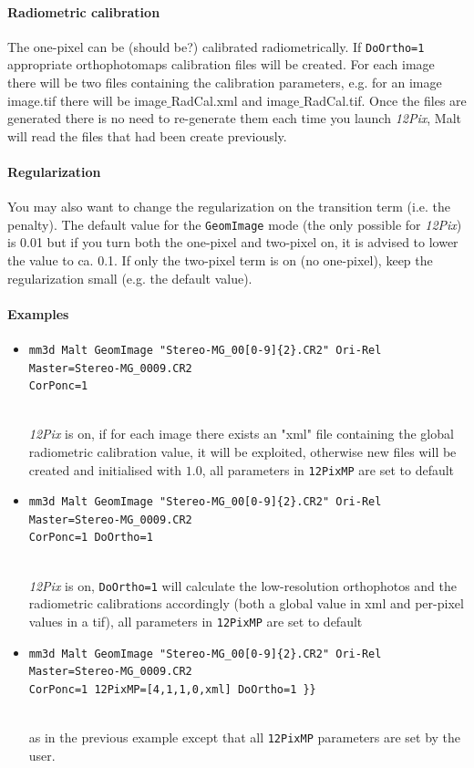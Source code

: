 \paragraph*{Radiometric calibration}
The one-pixel can be (should be?) calibrated radiometrically. If  {\tt{DoOrtho=1}} appropriate orthophotomaps calibration files will be created. For each image there will be two files containing the calibration parameters, e.g. for an image image.tif there will be  image$\_$RadCal.xml  and  image$\_$RadCal.tif. Once the files are generated there is no need to re-generate them each time you launch  \textit{12Pix}, Malt will read the files that had been create previously.\\
%
\paragraph*{Regularization}
You may also want to change the regularization on the transition term (i.e. the penalty). The default value for the {\tt GeomImage} mode (the only possible for \textit{12Pix}) is 0.01 but if you turn both the one-pixel and two-pixel on, it is advised to lower the value to ca. 0.1. If only the two-pixel term is on (no one-pixel), keep the regularization small (e.g. the default value).

\paragraph*{Examples}
%
\begin{itemize}
\item 
\begin{verbatim}  
mm3d Malt GeomImage "Stereo-MG_00[0-9]{2}.CR2" Ori-Rel Master=Stereo-MG_0009.CR2 
CorPonc=1 
\end{verbatim}\\
\textit{12Pix} is on, if for each image there exists an "xml" file containing the global radiometric calibration value, it will be exploited, otherwise new files will be created and initialised with $1.0$, all parameters in {\tt 12PixMP} are set to default
\\
\item 
\begin{verbatim}   
mm3d Malt GeomImage "Stereo-MG_00[0-9]{2}.CR2" Ori-Rel Master=Stereo-MG_0009.CR2 
CorPonc=1 DoOrtho=1 
\end{verbatim}\\
\textit{12Pix} is on, {\tt DoOrtho=1} will calculate the low-resolution orthophotos and the radiometric calibrations accordingly (both a global value in xml and per-pixel values in a tif), all parameters in {\tt 12PixMP} are set to default
\\
\item 
\begin{verbatim}  
mm3d Malt GeomImage "Stereo-MG_00[0-9]{2}.CR2" Ori-Rel Master=Stereo-MG_0009.CR2 
CorPonc=1 12PixMP=[4,1,1,0,xml] DoOrtho=1 }}
\end{verbatim}\\
as in the previous example except that all {\tt 12PixMP} parameters are set by the user.
\end{itemize}

